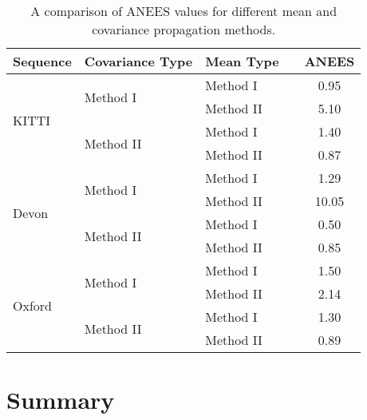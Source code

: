 \begin{table}[]
\centering
\caption{A comparison of ANEES values for different mean and covariance propagation methods.}
\label{tab:sun-bcnn_cov_estimation_comp}
\begin{tabular}{@{}lllcc@{}}
\textbf{Sequence}                & \textbf{Covariance Type}              &   \textbf{Mean Type}   &  & \textbf{ANEES} \\ \midrule
\multirow{4}{*}{KITTI}  & \multirow{2}{*}{Method I} &  Method I &  & 0.95  \\
                        &                         &   Method II &  & 5.10  \B \\  
                        
                        & \multirow{2}{*}{Method II} &  Method I &  & 1.40  \T \\
                        &                         &   Method II &  & 0.87  \\ \midrule
                        
\multirow{4}{*}{Devon}  & \multirow{2}{*}{Method I} &   Method I &  & 1.29   \\
                        &                         &   Method II &  & 10.05 \B \\
                        
                        & \multirow{2}{*}{Method II} &   Method I &  & 0.50  \T\\
                        &                         &   Method II &  & 0.85  \\ \midrule
                        
\multirow{4}{*}{Oxford} & \multirow{2}{*}{Method I} &   Method I &  & 1.50  \\
                        &                         &   Method II &  & 2.14  \B \\
                        & \multirow{2}{*}{Method II} &   Method I &  & 1.30  \T \\
                        &                         &   Method II &  & 0.89  \\ \bottomrule
\end{tabular}
\end{table}

\section{Summary}

